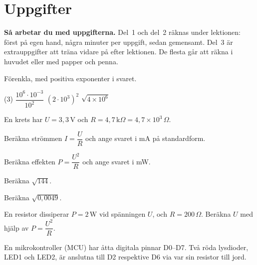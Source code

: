 
\section{Uppgifter}
\label{c6:sec:uppgifter}

\begin{aside}
\textbf{Så arbetar du med uppgifterna.} Del~1 och del~2 räknas under lektionen: först på egen
hand, några minuter per uppgift, sedan gemensamt. Del~3 är extrauppgifter att träna vidare på
efter lektionen. De flesta går att räkna i huvudet eller med papper och penna.

\end{aside}


Förenkla, med positiva exponenter i svaret.
\begin{delar}(3)
  \task $\dfrac{10^6 \cdot 10^{-3}}{10^2}$
  \task $(2 \cdot 10^3)^2$
  \task $\sqrt{4 \times 10^6}$
\end{delar}

En krets har $U = 3{,}3\,\text{V}$ och $R = 4{,}7\,\text{k}\Omega = 4{,}7 \times 10^3\,\Omega$.
\begin{parts}
  \item Beräkna strömmen $I = \dfrac{U}{R}$ och ange svaret i mA på standardform.
  \item Beräkna effekten $P = \dfrac{U^2}{R}$ och ange svaret i mW.
\end{parts}

\begin{parts}
  \item Beräkna $\sqrt{144}$.
  \item Beräkna $\sqrt{0{,}0049}$.
  \item En resistor dissiperar $P = 2\,\text{W}$ vid spänningen $U$, och $R = 200\,\Omega$.
    Beräkna $U$ med hjälp av $P = \dfrac{U^2}{R}$.
\end{parts}

En mikrokontroller (MCU) har åtta digitala pinnar D0--D7. Två röda lysdioder, LED1 och LED2, är
anslutna till D2 respektive D6 via var sin resistor till jord.


